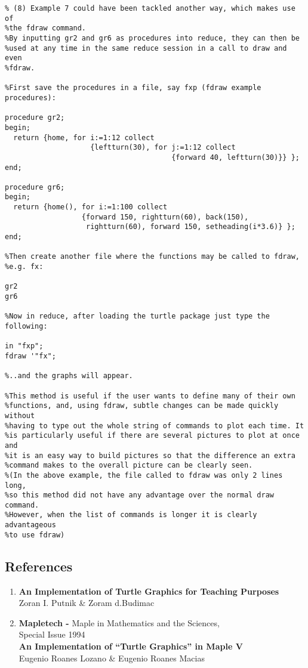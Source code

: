 \begin{verbatim}
% (8) Example 7 could have been tackled another way, which makes use of
%the fdraw command.
%By inputting gr2 and gr6 as procedures into reduce, they can then be
%used at any time in the same reduce session in a call to draw and even
%fdraw.

%First save the procedures in a file, say fxp (fdraw example procedures):

procedure gr2;
begin;
  return {home, for i:=1:12 collect
                    {leftturn(30), for j:=1:12 collect
                                       {forward 40, leftturn(30)}} };
end;

procedure gr6;
begin;
  return {home(), for i:=1:100 collect
                  {forward 150, rightturn(60), back(150),
                   rightturn(60), forward 150, setheading(i*3.6)} };
end;

%Then create another file where the functions may be called to fdraw,
%e.g. fx:

gr2
gr6

%Now in reduce, after loading the turtle package just type the following:

in "fxp";
fdraw '"fx";

%..and the graphs will appear.

%This method is useful if the user wants to define many of their own
%functions, and, using fdraw, subtle changes can be made quickly without
%having to type out the whole string of commands to plot each time. It
%is particularly useful if there are several pictures to plot at once and
%it is an easy way to build pictures so that the difference an extra
%command makes to the overall picture can be clearly seen.
%(In the above example, the file called to fdraw was only 2 lines long,
%so this method did not have any advantage over the normal draw command.
%However, when the list of commands is longer it is clearly advantageous
%to use fdraw)
\end{verbatim}


\subsection{References}

\begin{enumerate}
 \item {\bf An Implementation of Turtle Graphics for Teaching Purposes}\\
         Zoran I. Putnik \& Zoram d.Budimac

 \item {\bf Mapletech -} Maple in Mathematics and the Sciences,\\
        Special Issue 1994\\
       {\bf An Implementation of ``Turtle Graphics'' in Maple V}\\
         Eugenio Roanes Lozano \&  Eugenio Roanes Macias

\end{enumerate}
